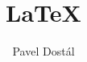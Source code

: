 \documentclass{article}
\title{LaTeX}
\author{Pavel Dostál}
\begin{document}
	\pagestyle{empty}
	\begin{multicols}{2}
		
		
		
	\columnbreak
		
		
		
	\end{multicols}
\pagebreak
	
	
\pagebreak
	
	
	
	
\end{document}
